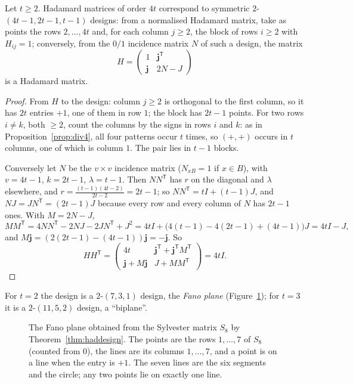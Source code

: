 \begin{theorem}\label{thm:haddesign}
Let $t\ge2$. Hadamard matrices of order $4t$ correspond to symmetric $2$-$(4t-1,2t-1,t-1)$ designs: from a normalised Hadamard matrix, take as points
the rows $2,\dots,4t$ and, for each column $j\ge2$, the block of rows $i\ge2$ with $H_{ij}=1$; conversely, from the $0/1$ incidence matrix $N$ of such a
design, the matrix
\[
H=\begin{pmatrix}1&\mathbf j^{\mathsf T}\\\mathbf j&2N-J\end{pmatrix}
\]
is a Hadamard matrix.
\end{theorem}
\begin{proof}
From $H$ to the design: column $j\ge2$ is orthogonal to the first column, so it has $2t$ entries $+1$, one of them in row $1$; the block has $2t-1$
points. For two rows $i\neq k$, both $\ge2$, count the columns by the signs in rows $i$ and $k$: as in Proposition~\ref{prop:div4}, all four patterns
occur $t$ times, so $(+,+)$ occurs in $t$ columns, one of which is column $1$. The pair lies in $t-1$ blocks.

Conversely let $N$ be the $v\times v$ incidence matrix ($N_{xB}=1$ if $x\in B$), with $v=4t-1$, $k=2t-1$, $\lambda=t-1$. Then $NN^{\mathsf T}$ has
$r$ on the diagonal and $\lambda$ elsewhere, and $r=\frac{(t-1)(4t-2)}{2t-2}=2t-1$; so $NN^{\mathsf T}=tI+(t-1)J$, and $NJ=JN^{\mathsf T}=(2t-1)J$
because every row and every column of $N$ has $2t-1$ ones. With $M=2N-J$,
\[
MM^{\mathsf T}=4NN^{\mathsf T}-2NJ-2JN^{\mathsf T}+J^2=4tI+\bigl(4(t-1)-4(2t-1)+(4t-1)\bigr)J=4tI-J,
\]
and $M\mathbf j=(2(2t-1)-(4t-1))\mathbf j=-\mathbf j$. So
\[
HH^{\mathsf T}=\begin{pmatrix}4t&\mathbf j^{\mathsf T}+\mathbf j^{\mathsf T}M^{\mathsf T}\\\mathbf j+M\mathbf j&J+MM^{\mathsf T}\end{pmatrix}=4tI.
\]
\end{proof}

For $t=2$ the design is a $2$-$(7,3,1)$ design, the \emph{Fano plane} (Figure~\ref{fig:fano}); for $t=3$ it is a $2$-$(11,5,2)$ design, a ``biplane''.

\begin{figure}[ht]
\centering
{}
\caption{The Fano plane obtained from the Sylvester matrix $S_8$ by Theorem~\ref{thm:haddesign}. The points are the rows $1,\dots,7$ of $S_8$ (counted
from $0$), the lines are its columns $1,\dots,7$, and a point is on a line when the entry is $+1$. The seven lines are the six segments and the
circle; any two points lie on exactly one line.}
\label{fig:fano}
\end{figure}


